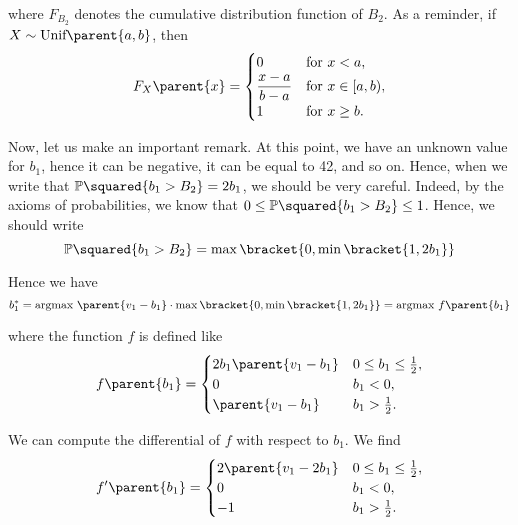 where $F_{B_2}$ denotes the cumulative distribution function of $B_{2}$. As a reminder, if $X \sim \text{Unif} \parent{a, b}$, then
\begin{equation*}
F_{X} \parent{x} =
\begin{cases}
    0                   & {\text{for }} x<a, \\
    \dfrac{x-a}{b-a}    & {\text{for }} x \in [a,b), \\
    1                   & {\text{for }} x \geq b.
\end{cases}
\end{equation*}

\vspace{5mm}

Now, let us make an important remark. At this point, we have an unknown value for $b_1$, hence it can be negative, it can be equal to 42, and so on. Hence, when we write that $\mathbb{P} \squared{b_1 > B_2} = 2 b_1$, we should be very careful. Indeed, by the axioms of probabilities, we know that $0 \leq \mathbb{P} \squared{b_1 > B_2} \leq 1$. Hence, we should write
\begin{equation*}
    \mathbb{P} \squared{b_1 > B_2} = \max \bracket{0, \min \bracket{1, 2 b_1}}
\end{equation*}

Hence we have
\begin{equation*}
    b_1^{*}
    = \text{argmax} \ \parent{v_1 - b_1} \cdot \max \bracket{0, \min \bracket{1, 2 b_1}}
    = \text{argmax} \ f \parent{b_1}
\end{equation*}

where the function $f$ is defined like
\begin{equation*}
    f \parent{b_1}
    =
    \begin{cases}
       2 b_1 \parent{v_1 - b_1}  & 0 \leq b_1 \leq \frac{1}{2}, \\
       0 & b_1 < 0, \\
       \parent{v_1 - b_1} & b_1 > \frac{1}{2}. \\ 
     \end{cases}
\end{equation*}

We can compute the differential of $f$ with respect to $b_1$. We find
\begin{equation*}
    f' \parent{b_1}
    =
    \begin{cases}
       2 \parent{v_1 - 2 b_1}  & 0 \leq b_1 \leq \frac{1}{2}, \\
       0 & b_1 < 0, \\
       -1 & b_1 > \frac{1}{2}. \\ 
     \end{cases}
\end{equation*}

